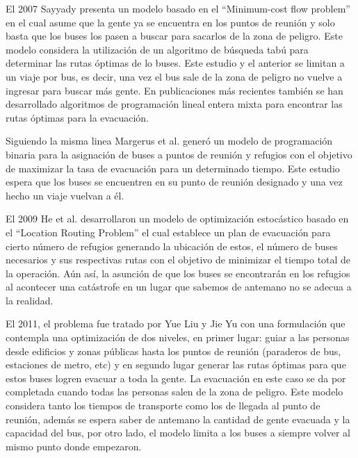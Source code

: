 \documentclass[letter, 10pt]{article}
\begin{document}
    El 2007 Sayyady\cite{sayyady2007optimizing} presenta un modelo basado en el
    ``Minimum-cost flow problem'' en el cual asume que la gente ya se encuentra
    en los puntos de reunión y solo basta que los buses los pasen a buscar para
    sacarlos de la zona de peligro. Este modelo considera la utilización de un
    algoritmo de búsqueda tabú para determinar las rutas óptimas de lo buses.
    Este estudio y el anterior se limitan a un viaje por bus, es decir, una
    vez el bus sale de la zona de peligro no vuelve a ingresar para buscar más
    gente. En publicaciones más 
    recientes\cite{sayyady2010optimizing}\cite{tunc2011optimizing} también se
    han desarrollado algoritmos de programación lineal entera mixta para
     encontrar las rutas óptimas para la evacuación.

     Siguiendo la misma linea Margerus et al.\cite{margulis2006hurricane} 
     generó un modelo de programación binaria para la asignación de buses a
     puntos de reunión y refugios con el objetivo de maximizar la tasa de
     evacuación para un determinado tiempo. Este estudio espera que los buses
     se encuentren en su punto de reunión designado y una vez hecho un viaje
     vuelvan a él.

     El 2009 He et al.\cite{he2009optimal} desarrollaron un modelo de
     optimización estocástico basado en el ``Location Routing Problem'' el
     cual establece un plan de evacuación para cierto número de refugios
     generando la ubicación de estos, el número de buses necesarios y sus
     respectivas rutas con el objetivo de minimizar el tiempo total de la
     operación. Aún así, la asunción de que los buses se encontrarán en los
     refugios al acontecer una catástrofe en un lugar que sabemos de antemano 
     no se adecua a la realidad.

     El 2011, el problema fue tratado por Yue Liu y Jie
     Yu\cite{liu2011emergency} con una formulación que contempla una
     optimización de dos niveles, en primer lugar: guiar a las personas desde
     edificios y zonas públicas hasta los puntos de reunión (paraderos de bus,
     estaciones de metro, etc) y en segundo lugar generar las rutas óptimas para
     que estos buses logren evacuar a toda la gente. La evacuación en este caso
     se da por completada cuando todas las personas salen de la zona de peligro.
     Este modelo considera tanto los tiempos de transporte como los de llegada
     al punto de reunión, además se espera saber de antemano la cantidad de
     gente evacuada y la capacidad del bus, por otro lado, el modelo limita a
     los buses a siempre volver al mismo punto donde empezaron.
\end{document}
